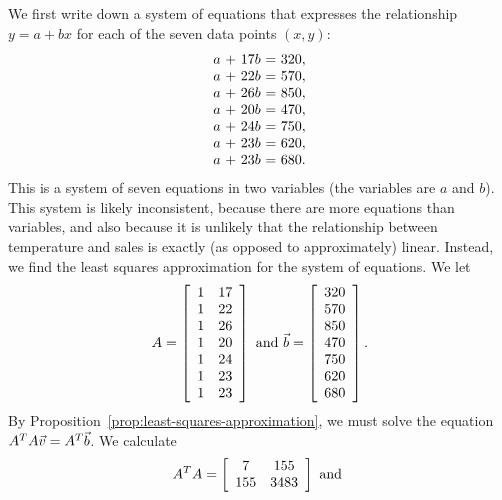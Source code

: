 \documentclass{ximera}
\begin{document}
\begin{solution}
  We first write down a system of equations that expresses the
  relationship $y=a+bx$ for each of the seven data points $(x,y)$:
  \begin{equation*}
    \begin{array}{r@{~}c@{~}r@{~}c@{~}r}
      a &+& 17b &=& 320, \\
      a &+& 22b &=& 570, \\
      a &+& 26b &=& 850, \\
      a &+& 20b &=& 470, \\
      a &+& 24b &=& 750, \\
      a &+& 23b &=& 620, \\
      a &+& 23b &=& 680. \\
    \end{array}
  \end{equation*}
  This is a system of seven equations in two variables (the variables
  are $a$ and $b$). This system is likely inconsistent, because there
  are more equations than variables, and also because it is unlikely
  that the relationship between temperature and sales is exactly (as
  opposed to approximately) linear. Instead, we find the least squares
  approximation for the system of equations. We let
  \begin{equation*}
    A = \startmat{rr}
      1 & 17 \\
      1 & 22 \\
      1 & 26 \\
      1 & 20 \\
      1 & 24 \\
      1 & 23 \\
      1 & 23 \\
    \stopmat
    \quad\mbox{and}\quad
    \vect{b} =
    \startmat{r}
      320 \\
      570 \\
      850 \\
      470 \\
      750 \\
      620 \\
      680 \\
    \stopmat.
\end{equation*}
By Proposition~\ref{prop:least-squares-approximation}, we must solve
the equation $A^TA\vect{v} = A^T\vect{b}$. We calculate
\begin{equation*}
    A^TA = \startmat{cc}
      7 & 155 \\
      155 & 3483
    \stopmat
    \quad\mbox{and}\quad

\end{equation*}
\end{solution}
\end{document}
